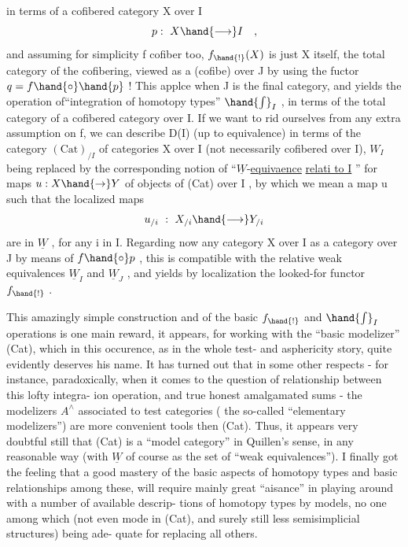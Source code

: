 
in terms of a cofibered category X over I
\[ p:\ X \hand{\longrightarrow} I \quad , \]
and assuming for simplicity f cofiber too, $f_{\hand{!}}(X)$ is just X itself,
the total category of the cofibering, viewed as a (cofibe) 
over J by using the fuctor $q = f\hand{\circ}\hand{p}$ ! This applce when J
is the final category, and yields the operation of``integration of
homotopy types'' $\hand{\int}_I$ , in terms of the total category of a  cofibered
category over I. If we want to rid ourselves from any extra assumption
on f, we can describe D(I) (up to equivalence) in terms of the category
$(\mathrm{Cat})_{/I}$ of categories X over I (not necessarily cofibered over I), $W_I$
being replaced by the corresponding notion of ``$\underline{W}$-\uline{equivaence}  \uline{relati
to I} '' for maps $u : X \hand{\to} Y$ of objects of (Cat) over I , by which we mean
a map u such that the localized maps
\[ u_{/i} \ :\ X_{/i} \hand{\longrightarrow} Y_{/i} \]
are in $\underline{W}$ , for any i in I. Regarding now any category X over I as a
category over J by means of $f\hand{\circ}p$ , this is  compatible with the relative
weak equivalences $\underline{W}_I$ and $\underline{W}_J$ , and yields by localization the looked-for
functor $f_{\hand{!}}$ .

This amazingly simple construction and  of the basic
$f_{\hand{!}}$ and $\hand{\int}_I$ operations is one main reward, it appears, for working with
the ``basic modelizer'' (Cat), which in this occurence, as in the whole
test- and asphericity story, quite evidently deserves his name. It has
turned out  that in some other respects - for instance, paradoxically,
when it comes to the question of relationship between this lofty integra-%
ion operation, and true honest amalgamated sums - the modelizers $A^{\wedge}$
associated to test categories  ( the so-called ``elementary modelizers'') are
more convenient tools then (Cat). Thus, it appears very doubtful still
that (Cat) is a ``model category'' in Quillen's sense, in any reasonable
way (with $\underline{W}$ of course as the set of ``weak equivalences''). I finally got
the feeling that  a good mastery of the basic aspects of homotopy types
and   basic relationships among these, will require mainly
great ``aisance'' in playing  around with a number of available descrip-%
tions of homotopy types by models, no one among which (not even  mode
in (Cat), and surely  still less  semisimplicial structures) being ade-%
quate for replacing all others.

